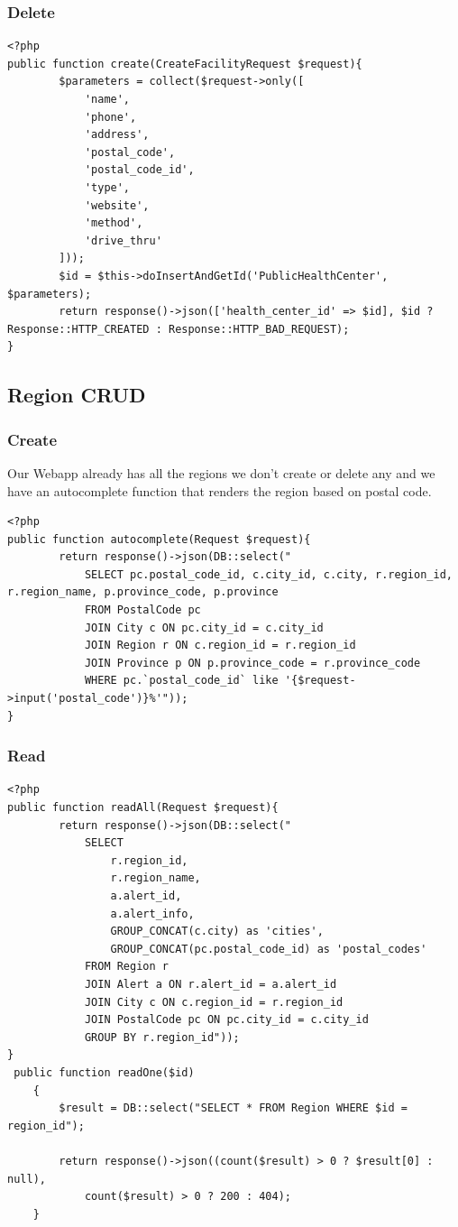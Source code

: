 \documentclass{article}
\begin{document}
\subsubsection{Delete}
\begin{verbatim}
<?php
public function create(CreateFacilityRequest $request){
        $parameters = collect($request->only([
            'name',
            'phone',
            'address',
            'postal_code',
            'postal_code_id',
            'type',
            'website',
            'method',
            'drive_thru'
        ]));
        $id = $this->doInsertAndGetId('PublicHealthCenter', $parameters);
        return response()->json(['health_center_id' => $id], $id ? Response::HTTP_CREATED : Response::HTTP_BAD_REQUEST);
}
\end{verbatim}
\subsection{Region CRUD}
\subsubsection{Create}
Our Webapp already has all the regions we don't create or delete any and we have an autocomplete function that renders the region based on postal code.
\begin{verbatim}
<?php
public function autocomplete(Request $request){
        return response()->json(DB::select("
            SELECT pc.postal_code_id, c.city_id, c.city, r.region_id, r.region_name, p.province_code, p.province
            FROM PostalCode pc
            JOIN City c ON pc.city_id = c.city_id
            JOIN Region r ON c.region_id = r.region_id
            JOIN Province p ON p.province_code = r.province_code
            WHERE pc.`postal_code_id` like '{$request->input('postal_code')}%'"));
}
\end{verbatim}
\subsubsection{Read}
\begin{verbatim}
<?php
public function readAll(Request $request){
        return response()->json(DB::select("
            SELECT
                r.region_id,
                r.region_name,
                a.alert_id,
                a.alert_info,
                GROUP_CONCAT(c.city) as 'cities',
                GROUP_CONCAT(pc.postal_code_id) as 'postal_codes'
            FROM Region r
            JOIN Alert a ON r.alert_id = a.alert_id
            JOIN City c ON c.region_id = r.region_id
            JOIN PostalCode pc ON pc.city_id = c.city_id
            GROUP BY r.region_id"));
}
 public function readOne($id)
    {
        $result = DB::select("SELECT * FROM Region WHERE $id = region_id");

        return response()->json((count($result) > 0 ? $result[0] : null),
            count($result) > 0 ? 200 : 404);
    }
    
\end{verbatim}
\end{document}
